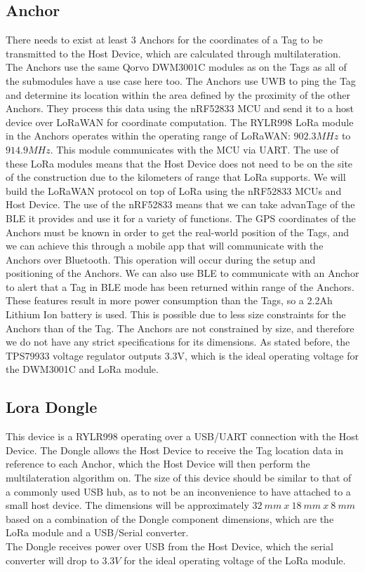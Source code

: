 \documentclass[conference]{IEEEtran}
\begin{document}
\subsection{Anchor}
There needs to exist at least $3$ Anchors for the coordinates of a Tag to be 
transmitted to the Host Device, which are calculated through multilateration. 
The Anchors use the same Qorvo DWM3001C modules as on the Tags as all 
of the submodules have a use case here too. The Anchors use UWB to ping 
the Tag and determine its location within the area defined by the 
proximity of the other Anchors. They process this data using the 
nRF52833 MCU and send it to a host device over LoRaWAN for coordinate computation. 
The RYLR998 LoRa module in the Anchors operates within the operating range of 
LoRaWAN: $902.3 MHz$ to $914.9 MHz$. This module communicates with the MCU 
via UART. The use of these LoRa modules means that the Host Device does 
not need to be on the site of the construction due to the 
kilometers of range that LoRa supports. We will build the LoRaWAN 
protocol on top of LoRa using the nRF52833 MCUs and Host Device. The use of the nRF52833 
means that we can take advanTage of the BLE it provides and use 
it for a variety of functions. The GPS coordinates of the Anchors must 
be known in order to get the real-world position of the Tags, and we can achieve
this through a mobile app that will communicate with the Anchors over Bluetooth. 
This operation will occur during the setup and positioning of the Anchors. We can also
use BLE to communicate with an Anchor to alert that a Tag in 
BLE mode has been returned within range of the Anchors. These features 
result in  more power consumption than the Tags, so a 2.2Ah Lithium Ion 
battery is used. This is possible due to less size constraints for the 
Anchors than of the Tag. The Anchors are not constrained by size, and therefore we 
do not have any strict specifications for its dimensions.
As stated before, the TPS79933 voltage regulator outputs 3.3V, which is 
the ideal operating voltage for the DWM3001C and LoRa module. 


\subsection{Lora Dongle}
This device is a RYLR998 operating over a USB/UART connection with the 
Host Device. The Dongle allows the Host Device to receive the Tag location data in 
reference to each Anchor, which the Host Device will then perform the multilateration algorithm on.
The size of this device should be similar 
to that of a commonly used USB hub, as to not be an inconvenience to have attached to a 
small host device. The dimensions will be approximately $32 \ mm\  x \ 18 \ mm \
x \ 8 \ mm$ based on a combination of the Dongle component dimensions, which are the LoRa 
module and a USB/Serial converter. 
\\ The Dongle receives power over USB from the Host Device, which the serial converter will
drop to $3.3V$ for the ideal operating voltage of the LoRa module.
\end{document}
